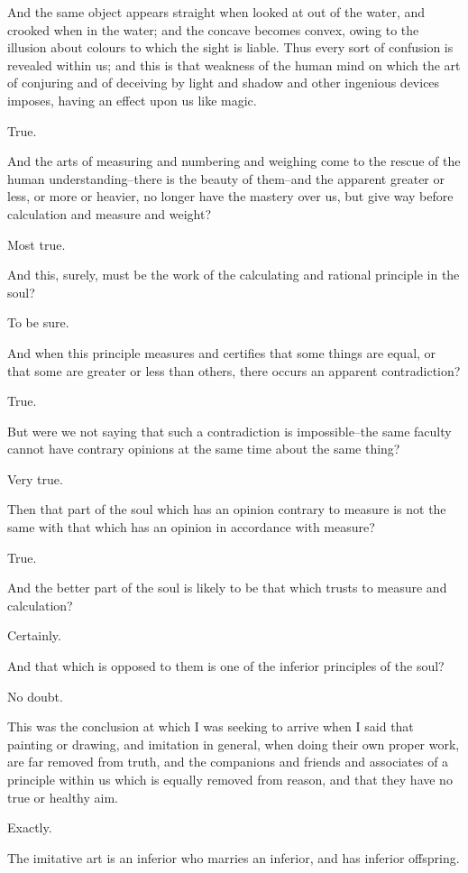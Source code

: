 And the same object appears straight when looked at out of the water,
and crooked when in the water; and the concave becomes convex, owing to
the illusion about colours to which the sight is liable. Thus every sort
of confusion is revealed within us; and this is that weakness of the
human mind on which the art of conjuring and of deceiving by light and
shadow and other ingenious devices imposes, having an effect upon us
like magic.

True.

And the arts of measuring and numbering and weighing come to the
rescue of the human understanding--there is the beauty of them--and the
apparent greater or less, or more or heavier, no longer have the mastery
over us, but give way before calculation and measure and weight?

Most true.

And this, surely, must be the work of the calculating and rational
principle in the soul?

To be sure.

And when this principle measures and certifies that some things are
equal, or that some are greater or less than others, there occurs an
apparent contradiction?

True.

But were we not saying that such a contradiction is impossible--the same
faculty cannot have contrary opinions at the same time about the same
thing?

Very true.

Then that part of the soul which has an opinion contrary to measure is
not the same with that which has an opinion in accordance with measure?

True.

And the better part of the soul is likely to be that which trusts to
measure and calculation?

Certainly.

And that which is opposed to them is one of the inferior principles of
the soul?

No doubt.

This was the conclusion at which I was seeking to arrive when I said
that painting or drawing, and imitation in general, when doing their own
proper work, are far removed from truth, and the companions and friends
and associates of a principle within us which is equally removed from
reason, and that they have no true or healthy aim.

Exactly.

The imitative art is an inferior who marries an inferior, and has
inferior offspring.

